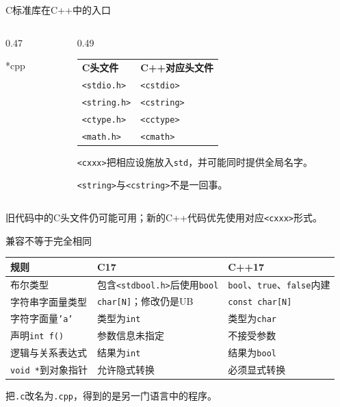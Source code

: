 \begin{frame}{C标准库在C++中的入口}
\begin{columns}[T]
\begin{column}{0.47\textwidth}
\begin{Code}*{cpp}\end{Code}
\end{column}
\begin{column}{0.49\textwidth}
\small
\begin{tabular}{ll}
\textbf{C头文件} & \textbf{C++对应头文件}\\
\texttt{<stdio.h>} & \texttt{<cstdio>}\\
\texttt{<string.h>} & \texttt{<cstring>}\\
\texttt{<ctype.h>} & \texttt{<cctype>}\\
\texttt{<math.h>} & \texttt{<cmath>}
\end{tabular}

\medskip\texttt{<cxxx>}把相应设施放入\texttt{std}，并可能同时提供全局名字。

\medskip\alert{\texttt{<string>}与\texttt{<cstring>}不是一回事。}
\end{column}
\end{columns}
\medskip
\small 旧代码中的C头文件仍可能可用；新的C++代码优先使用对应\texttt{<cxxx>}形式。
\end{frame}

\begin{frame}{兼容不等于完全相同}
\small
\setlength{\tabcolsep}{4pt}
\renewcommand{\arraystretch}{1.25}
\begin{tabular}{p{}p{}p{}}
\textbf{规则} & \textbf{C17} & \textbf{C++17}\\
\hline
布尔类型 & 包含\texttt{<stdbool.h>}后使用\texttt{bool} & \texttt{bool}、\texttt{true}、\texttt{false}内建\\
字符串字面量类型 & \texttt{char[N]}；修改仍是UB & \texttt{const char[N]}\\
字符字面量\texttt{'a'} & 类型为\texttt{int} & 类型为\texttt{char}\\
声明\texttt{int f()} & 参数信息未指定 & 不接受参数\\
逻辑与关系表达式 & 结果为\texttt{int} & 结果为\texttt{bool}\\
\texttt{void *}到对象指针 & 允许隐式转换 & 必须显式转换
\end{tabular}

\medskip\normalsize
\alert{把\texttt{.c}改名为\texttt{.cpp}，得到的是另一门语言中的程序。}
\end{frame}

